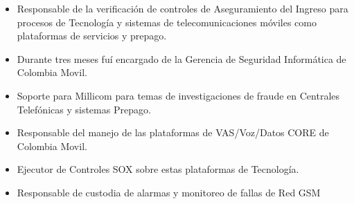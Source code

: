 \documentclass[10pt,letter]{altacv}
\begin{document}
\divider
 
\begin{itemize}
\item Responsable de la verificación de controles de Aseguramiento del Ingreso para procesos de Tecnología y sistemas de telecomunicaciones móviles como plataformas de servicios y prepago.
\item Durante tres meses fuí encargado de la Gerencia de Seguridad Informática de Colombia Movil.
\item Soporte para Millicom para temas de investigaciones de fraude en Centrales Telefónicas y sistemas Prepago. 
\end{itemize}
 
\divider
	
\clearpage
{}

\begin{itemize}
\item Responsable del manejo de las plataformas de VAS/Voz/Datos CORE de Colombia Movil. 
\item Ejecutor de Controles SOX sobre estas plataformas de Tecnología.
\end{itemize}
\divider


\begin{itemize}
\item Responsable de custodia de alarmas y monitoreo de fallas de Red GSM
\end{itemize}
\end{document}
